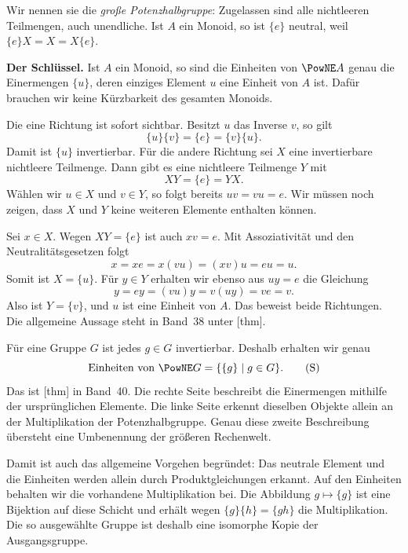 Wir nennen sie die \emph{große Potenzhalbgruppe}: Zugelassen
sind alle nichtleeren Teilmengen, auch unendliche. Ist \(A\)
ein Monoid, so ist \(\{e\}\) neutral, weil
\(\{e\}X=X=X\{e\}\).

\medskip\noindent\textbf{Der Schlüssel.}
Ist \(A\) ein Monoid, so sind die Einheiten von \(\PowNE A\)
genau die Einermengen
\(\{u\}\), deren einziges Element \(u\) eine Einheit von \(A\)
ist. Dafür brauchen wir keine Kürzbarkeit des gesamten Monoids.

Die eine Richtung ist sofort sichtbar. Besitzt \(u\) das
Inverse \(v\), so gilt
\[
  \{u\}\{v\}=\{e\}=\{v\}\{u\}.
\]
Damit ist \(\{u\}\) invertierbar. Für die andere Richtung sei
\(X\) eine invertierbare nichtleere Teilmenge. Dann gibt es eine
nichtleere Teilmenge \(Y\) mit
\begin{equation}
  XY=\{e\}=YX.
  \tag{E}\label{reconstruction-reading-inverse}
\end{equation}
Wählen wir \(u\in X\) und \(v\in Y\), so folgt bereits
\(uv=vu=e\). Wir müssen noch zeigen, dass \(X\) und \(Y\)
keine weiteren Elemente enthalten können.

Sei \(x\in X\). Wegen \(XY=\{e\}\) ist auch \(xv=e\).
Mit Assoziativität und den Neutralitätsgesetzen folgt
\[
  x=xe=x(vu)=(xv)u=eu=u.
\]
Somit ist \(X=\{u\}\). Für \(y\in Y\) erhalten wir ebenso
aus \(uy=e\) die Gleichung
\[
  y=ey=(vu)y=v(uy)=ve=v.
\]
Also ist \(Y=\{v\}\), und \(u\) ist eine Einheit von \(A\).
Das beweist beide Richtungen. Die allgemeine Aussage steht
in Band~38 unter [thm].

Für eine Gruppe \(G\) ist jedes \(g\in G\) invertierbar.
Deshalb erhalten wir genau
\begin{equation}
  \text{Einheiten von }\PowNE G
    =\{\{g\}\mid g\in G\}.
  \tag{S}\label{reconstruction-reading-singletons}
\end{equation}
Das ist [thm]
in Band~40. Die rechte Seite beschreibt die Einermengen mithilfe
der ursprünglichen Elemente. Die linke Seite erkennt dieselben
Objekte allein an der Multiplikation der Potenzhalbgruppe.
Genau diese zweite Beschreibung übersteht eine Umbenennung
der größeren Rechenwelt.

Damit ist auch das allgemeine Vorgehen begründet: Das neutrale
Element und die Einheiten werden allein durch Produktgleichungen
erkannt. Auf den Einheiten behalten wir die vorhandene
Multiplikation bei. Die Abbildung \(g\mapsto\{g\}\) ist eine
Bijektion auf diese Schicht und erhält wegen
\(\{g\}\{h\}=\{gh\}\) die Multiplikation. Die so ausgewählte
Gruppe ist deshalb eine isomorphe Kopie der Ausgangsgruppe.

